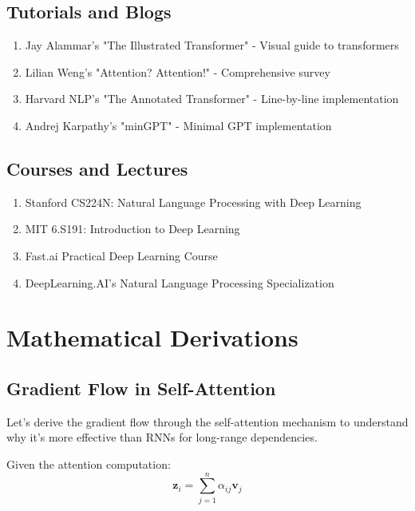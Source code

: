 \documentclass[11pt]{article}
\begin{document}
\subsection{Tutorials and Blogs}

\begin{enumerate}
    \item Jay Alammar's "The Illustrated Transformer" - Visual guide to transformers
    \item Lilian Weng's "Attention? Attention!" - Comprehensive survey
    \item Harvard NLP's "The Annotated Transformer" - Line-by-line implementation
    \item Andrej Karpathy's "minGPT" - Minimal GPT implementation
\end{enumerate}

\subsection{Courses and Lectures}

\begin{enumerate}
    \item Stanford CS224N: Natural Language Processing with Deep Learning
    \item MIT 6.S191: Introduction to Deep Learning
    \item Fast.ai Practical Deep Learning Course
    \item DeepLearning.AI's Natural Language Processing Specialization
\end{enumerate}

\appendix
\section{Mathematical Derivations}

\subsection{Gradient Flow in Self-Attention}

Let's derive the gradient flow through the self-attention mechanism to understand why it's more effective than RNNs for long-range dependencies.

Given the attention computation:
\begin{equation}
\mathbf{z}_i = \sum_{j=1}^{n} \alpha_{ij} \mathbf{v}_j
\end{equation}
\end{document}
